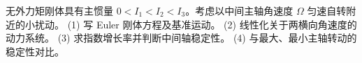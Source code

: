 无外力矩刚体具有主惯量 $0<I_1<I_2<I_3$。考虑以中间主轴角速度 $\Omega$ 匀速自转附近的小扰动。
(1) 写 Euler 刚体方程及基准运动。
(2) 线性化关于两横向角速度的动力系统。
(3) 求指数增长率并判断中间轴稳定性。
(4) 与最大、最小主轴转动的稳定性对比。
